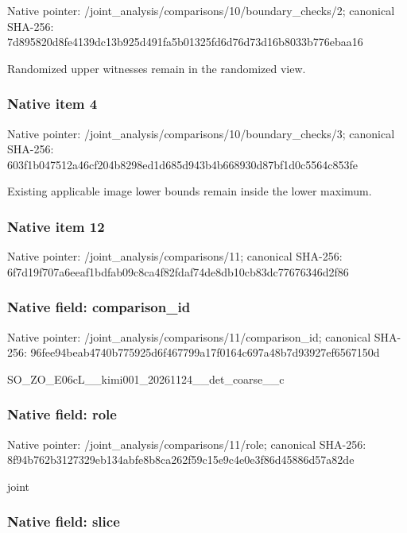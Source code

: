 \documentclass[10pt,a4paper]{article}
\begin{document}
Native pointer: /joint\_analysis/comparis\allowbreak{}ons/10/boundary\_checks/2; canonical SHA-256: 7d895820d8fe4139dc13b925\allowbreak{}d491fa5b01325fd6d76d73d1\allowbreak{}6b8033b776ebaa16


Randomized upper witnesses remain in the randomized view.


\subsubsection{Native item 4}


Native pointer: /joint\_analysis/comparis\allowbreak{}ons/10/boundary\_checks/3; canonical SHA-256: 603f1b047512a46cf204b829\allowbreak{}8ed1d685d943b4b668930d87\allowbreak{}bf1d0c5564c853fe


Existing applicable image lower bounds remain inside the lower maximum.


\subsubsection{Native item 12}


Native pointer: /joint\_analysis/comparisons/11; canonical SHA-256: 6f7d19f707a6eeaf1bdfab09\allowbreak{}c8ca4f82fdaf74de8db10cb8\allowbreak{}3dc77676346d2f86



\subsubsection{Native field: comparison\_id}


Native pointer: /joint\_analysis/comparis\allowbreak{}ons/11/comparison\_id; canonical SHA-256: 96fee94beab4740b775925d6\allowbreak{}f467799a17f0164c697a48b7\allowbreak{}d93927ef6567150d


SO\_ZO\_E06cL\_\_kimi001\_202\allowbreak{}61124\_\_det\_coarse\_\_c


\subsubsection{Native field: role}


Native pointer: /joint\_analysis/comparisons/11/role; canonical SHA-256: 8f94b762b3127329eb134abf\allowbreak{}e8b8ca262f59c15e9c4e0e3f\allowbreak{}86d45886d57a82de


joint


\subsubsection{Native field: slice}
\end{document}
